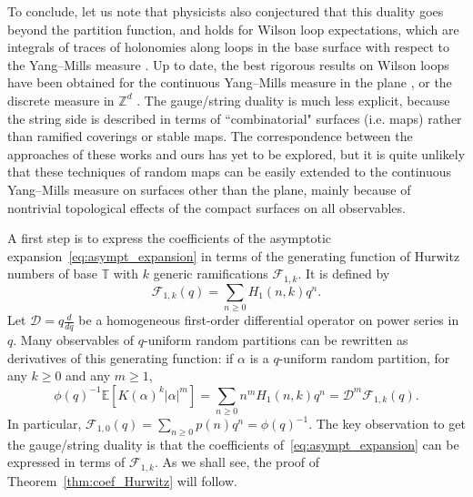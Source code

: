 \documentclass[11pt,a4paper,reqno]{article}
\theoremstyle{definition}
\theoremstyle{remark}
\newcommand\Z{{\mathbb Z}}
\newcommand\E{\mathbb{E}}
\newcommand\Tbb{\mathbb{T}}
\begin{document}
To conclude, let us note that physicists also conjectured that this duality goes beyond the partition function, and holds for Wilson loop expectations, which are integrals of traces of holonomies along loops in the base surface with respect to the Yang--Mills measure \cite{GT,GT2,CMR}. Up to date, the best rigorous results on Wilson loops have been obtained for the continuous Yang--Mills measure in the plane \cite{PPSY}, or the discrete measure in $\Z^d$ \cite{CPS}. The gauge/string duality is much less explicit, because the string side is described in terms of ``combinatorial" surfaces (i.e. maps) rather than ramified coverings or stable maps. The correspondence between the approaches of these works and ours has yet to be explored, but it is quite unlikely that these techniques of random maps can be easily extended to the continuous Yang--Mills measure on surfaces other than the plane, mainly because of nontrivial topological effects of the compact surfaces on all observables.

A first step is to express the coefficients of the asymptotic expansion~\eqref{eq:asympt_expansion} in terms of the generating function of Hurwitz numbers of base $\Tbb$ with $k$ generic ramifications $\mathcal{F}_{1,k}$. It is defined by
\begin{equation}
\mathcal{F}_{1,k}(q)=\sum_{n\geq 0}H_1(n,k)q^n.
\end{equation}
Let $\mathcal{D}=q\frac{d}{dq}$ be a homogeneous first-order differential operator on power series in $q$. Many observables of $q$-uniform random partitions can be rewritten as derivatives of this generating function: if $\alpha$ is a $q$-uniform random partition, for any $k\geq 0$ and any $m\geq 1$,
\begin{equation}\label{eq:GF_Hurwitz}
\phi(q)^{-1}\E[K(\alpha)^k\vert\alpha\vert^m]=\sum_{n\geq 0}n^mH_1(n,k)q^n=\mathcal{D}^m\mathcal{F}_{1,k}(q).
\end{equation}
In particular, $\mathcal{F}_{1,0}(q)=\sum_{n\geq 0}p(n)q^n=\phi(q)^{-1}$. The key observation to get the gauge/string duality is that the coefficients of~\eqref{eq:asympt_expansion} can be expressed in terms of $\mathcal{F}_{1,k}$. As we shall see, the proof of Theorem~\ref{thm:coef_Hurwitz} will follow.
\end{document}
